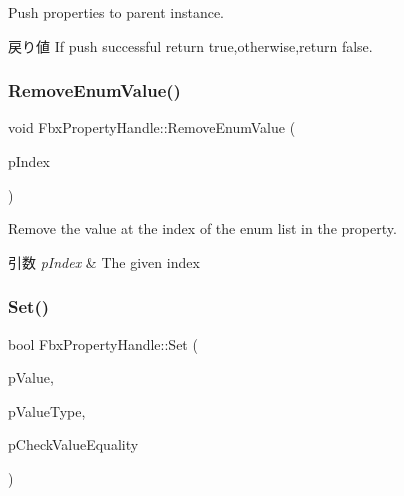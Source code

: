 Push properties to parent instance. \begin{DoxyReturn}{戻り値}
If push successful return true,otherwise,return false. 
\end{DoxyReturn}
\mbox{\label{class_fbx_property_handle_ad57e9833aa4c0815954b0a87d1c83fae}} 
\subsubsection{\texorpdfstring{Remove\+Enum\+Value()}{RemoveEnumValue()}}
{\footnotesize\ttfamily void Fbx\+Property\+Handle\+::\+Remove\+Enum\+Value (\begin{DoxyParamCaption}\item[{int}]{p\+Index }\end{DoxyParamCaption})}

Remove the value at the index of the enum list in the property. 
\begin{DoxyParams}{引数}
{\em p\+Index} & The given index \\
\hline
\end{DoxyParams}
\mbox{\label{class_fbx_property_handle_a9beb20c6080c4f51fb01a547cc53807f}} 
\subsubsection{\texorpdfstring{Set()}{Set()}\hspace{0.1cm}{\footnotesize\ttfamily [1/2]}}
{\footnotesize\ttfamily bool Fbx\+Property\+Handle\+::\+Set (\begin{DoxyParamCaption}\item[{const void $\ast$}]{p\+Value,  }\item[{\hyperlink{fbxpropertytypes_8h_a73913a5ddfb20e57c6f25e9e6784bd92}{E\+Fbx\+Type}}]{p\+Value\+Type,  }\item[{bool}]{p\+Check\+Value\+Equality }\end{DoxyParamCaption})}

